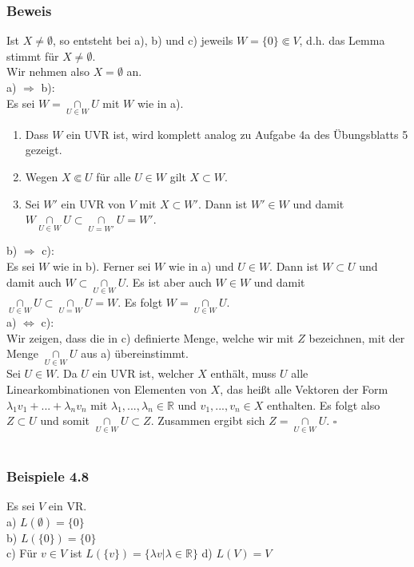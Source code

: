 \documentclass{article}
\begin{document}
\subsubsection*{Beweis}
Ist $X \neq \emptyset$, so entsteht bei a), b) und c) jeweils $W = \{0\} \Subset V$, d.h. das Lemma stimmt für $X \neq \emptyset$. \\
Wir nehmen also $X = \emptyset$ an. \\
a) $\Rightarrow$ b): \\
Es sei $W = \underset{U \in W}{\cap} U$ mit $W$ wie in a).
\begin{enumerate}
    \item Dass $W$ ein UVR ist, wird komplett analog zu Aufgabe 4a des Übungsblatts 5 gezeigt.
    \item Wegen $X \Subset U$ für alle $U \in W$ gilt $X \subset W$.
    \item Sei $W'$ ein UVR von $V$ mit $X \subset W'$. Dann ist $W' \in W$ und damit $W \underset{U \in W}{\cap} U \subset \underset{U = W'}{\cap} U = W'$. \\
\end{enumerate}
b) $\Rightarrow$ c): \\
Es sei $W$ wie in b). Ferner sei $W$ wie in a) und $U \in W$. Dann ist $W \subset U$ und damit auch $W \subset \underset{U \in W}{\cap} U$. Es ist aber auch $W \in W$ und damit $\underset{U \in W}{\cap} U \subset \underset{U = W}{\cap} U = W$. Es folgt $W = \underset{U \in W}{\cap} U$. \\
a) $\Leftrightarrow$ c): \\
Wir zeigen, dass die in c) definierte Menge, welche wir mit $Z$ bezeichnen, mit der Menge $\underset{U \in W}{\cap} U$ aus a) übereinstimmt. \\
Sei $U \in W$. Da $U$ ein UVR ist, welcher $X$ enthält, muss $U$ alle Linearkombinationen von Elementen von $X$, das heißt alle Vektoren der Form $\lambda_1 v_1 + ... + \lambda_n v_n$ mit $\lambda_1,...,\lambda_n \in \mathbb{R}$ und $v_1,...,v_n \in X$ enthalten. Es folgt also $Z \subset U$ und somit $\underset{U \in W}{\cap} U \subset Z$.  
Zusammen ergibt sich $Z = \underset{U \in W}{\cap} U$. $\square$ \\
\\
\subsubsection*{Beispiele 4.8}
Es sei $V$ ein VR. \\
a) $L(\emptyset) = \{0\}$ \\
b) $L(\{0\}) = \{0\}$ \\
c) Für $v \in V$ ist $L(\{v\}) = \{\lambda v | \lambda \in \mathbb{R}\}$
d) $L(V) = V$
\\
\end{document}
